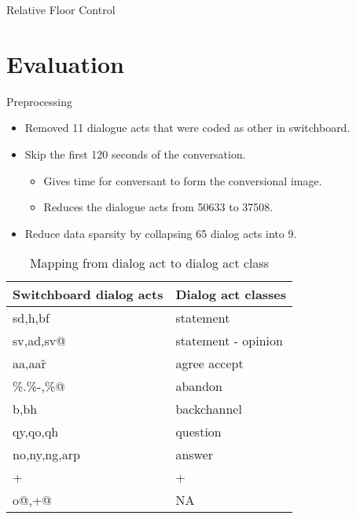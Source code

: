\begin{frame} {Relative Floor Control}
\end{frame}


\section{Evaluation}
\frame{\sectionpage}


\begin{frame}{Preprocessing}
  \begin{itemize}
    \item Removed 11 dialogue acts that were coded as other in switchboard.
    \item Skip the first 120 seconds of the conversation.
      \begin{itemize}
      \item Gives time for conversant to form the conversional image.
      \item Reduces the dialogue acts from 50633 to 37508.
      \end{itemize}
    \item Reduce data sparsity by collapsing 65 dialog acts into 9.
  \end{itemize}

  \begin{table}
     \begin{center}
     \begin{tabular}{l | l}
    \hline
Switchboard dialog acts &  Dialog act classes  \\
    \hline
sd,h,bf      & statement   \\
sv,ad,sv@    & statement - opinion  \\
aa,aa\^r     & agree accept \\
\%.\%-,\%@   & abandon      \\
b,bh         & backchannel  \\
qy,qo,qh     & question     \\
no,ny,ng,arp & answer       \\
+            & +            \\
o@,+@        & NA           \\
  \hline
\end{tabular}
\end{center}\vspace{-0.5em}
\caption{Mapping from dialog act to dialog act class}
\label{tab:mapping}
\end{table}
\end{frame}



